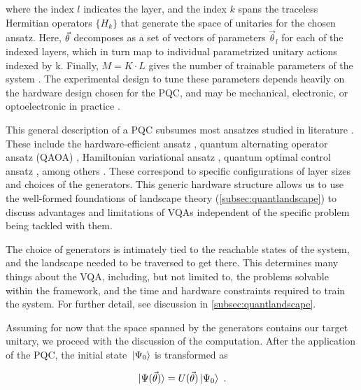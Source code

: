 where the index \(l\) indicates the layer, and the index \(k\) spans the
traceless Hermitian operators \(\{H_k\}\) that generate the space of unitaries
for the chosen ansatz. Here, \(\vec{\theta}\) decomposes as a set of vectors of
parameters \(\vec{\theta}_l\) for each of the indexed layers, which in turn map
to individual parametrized unitary actions indexed by k. Finally, \(M = K \cdot
L\) gives the number of trainable parameters of the system \cite[see][section
II.A]{larocca2021theory}. The experimental design to tune these parameters
depends heavily on the hardware design chosen for the PQC, and may be
mechanical, electronic, or optoelectronic in practice 
\cite{taylor2005fault,gong2013magnetoelectric,
stoneham2003optically,wagner1996molecular,
sederberg2020vectorized,baugher2014optoelectronic,
angelakis2007proposal}.

This general description of a PQC subsumes most ansatzes studied in literature
\cite{larocca2021diagnosing}. These include the hardware-efficient ansatz
\cite{kandala2017hardware}, quantum alternating operator ansatz (QAOA)
\cite{farhi2014quantum}, Hamiltonian variational ansatz
\cite{wecker2015progress}, quantum optimal control ansatz
\cite{choquette2021quantum}, among others \cite{hadfield2019quantum,
zhu2020adaptive, lee2021progress}. These correspond to specific configurations
of layer sizes and choices of the generators. This generic hardware structure
allows us to use the well-formed foundations of landscape theory
(\autoref{subsec:quantlandscape}) to discuss advantages and limitations of VQAs
independent of the specific problem being tackled with them. 

The choice of generators is intimately tied to the reachable states of the
system, and the landscape needed to be traversed to get there. This determines
many things about the VQA, including, but not limited to, the problems solvable
within the framework, and the time and hardware constraints required to train
the system. For further detail, see discussion in
\autoref{subsec:quantlandscape}.

Assuming for now that the space spanned by the generators contains our target
unitary, we proceed with the discussion of the computation. After the
application of the PQC, the initial state \(\ket*{\Psi_0}\) is transformed as

\begin{gather}
    \ket*{\Psi(\vec{\theta})} = U(\vec{\theta})\ket*{\Psi_0}~.
\end{gather}

